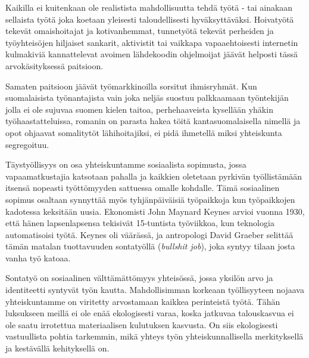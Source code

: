 \documentclass[nobib,finnish,oneside,openany,notoc,a4paper]{tufte-book}
\begin{document}
Kaikilla ei kuitenkaan ole realistista mahdollisuutta tehdä työtä - tai
ainakaan sellaista työtä joka koetaan yleisesti taloudellisesti
hyväksyttäväksi. Hoivatyötä tekevät omaishoitajat ja kotivanhemmat,
tunnetyötä tekevät perheiden ja työyhteisöjen hiljaiset sankarit,
aktivistit tai vaikkapa vapaaehtoisesti internetin kulmakiviä
kannattelevat avoimen lähdekoodin ohjelmoijat jäävät helposti tässä
arvokäsityksessä paitsioon.

Samaten paitsioon jäävät työmarkkinoilla sorsitut ihmisryhmät. Kun
suomalaisista työnantajista vain joka neljäs suostuu palkkaamaan
työntekijän jolla ei ole sujuvaa suomen kielen taitoa, perhehaaveista
kysellään yhäkin työhaastatteluissa, romanin on parasta hakea töitä
kantasuomalaisella nimellä ja opot ohjaavat somalitytöt lähihoitajiksi,
ei pidä ihmetellä miksi yhteiskunta segregoituu.

Täystyöllisyys on osa yhteiskuntamme sosiaalista sopimusta, jossa
vapaamatkustajia katsotaan pahalla ja kaikkien oletetaan pyrkivän
työllistämään itsensä nopeasti työttömyyden sattuessa omalle kohdalle.
Tämä sosiaalinen sopimus osaltaan synnyttää myös tyhjänpäiväisiä
työpaikkoja kun työpaikkojen kadotessa keksitään uusia. Ekonomisti John
Maynard Keynes arvioi vuonna 1930, että hänen lapsenlapsensa tekisivät
15-tuntista työviikkoa, kun teknologia automatisoisi työtä. Keynes oli
väärässä, ja antropologi David Graeber selittää tämän matalan
tuottavuuden sontatyöllä (\emph{bullshit job}), joka syntyy tilaan josta
vanha työ katoaa.

Sontatyö on sosiaalinen välttämättömyys yhteisössä, jossa yksilön arvo
ja identiteetti syntyvät työn kautta. Mahdollisimman korkeaan
työllisyyteen nojaava yhteiskuntamme on viritetty arvostamaan kaikkea
perinteistä työtä. Tähän luksukseen meillä ei ole enää ekologisesti varaa, koska
jatkuvaa talouskasvua ei ole saatu irrotettua materiaalisen kulutuksen
kasvusta. On siis ekologisesti vastuullista pohtia tarkemmin, mikä
yhteys työn yhteiskunnallisella merkityksellä ja kestävällä kehityksellä
on.
\end{document}
